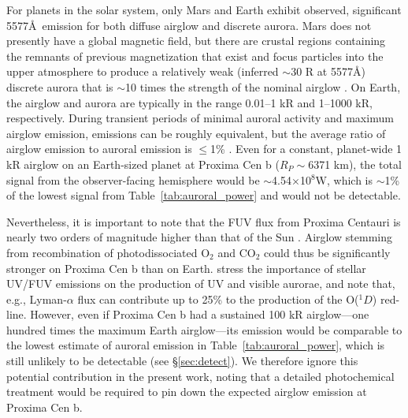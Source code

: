 \documentclass{emulateapj}
\begin{document}
For planets in the solar system, only Mars and Earth exhibit observed, significant 5577\AA\ emission for both diffuse airglow and discrete aurora. Mars does not presently have a global magnetic field, but there are crustal regions containing the remnants of previous magnetization that exist and focus particles into the upper atmosphere to produce a relatively weak (inferred $\sim$30 R at 5577\AA) discrete aurora that is $\sim$10 times the strength of the nominal airglow \citep[e.g.][]{Acuna2001,Bertaux2005,Lilensten2015}. On Earth, the airglow and aurora are typically in the range  0.01--1 kR and 1--1000 kR, respectively. During transient periods of minimal auroral activity and maximum airglow emission, emissions can be roughly equivalent, but the average ratio of airglow emission to auroral emission is $\leq$1\%  \citep[e.g.][]{Chamberlain1961,Greer1986}. Even for a constant, planet-wide 1 kR airglow on an Earth-sized planet at Proxima Cen b ($R_P\sim$6371 km), the total signal from the observer-facing hemisphere would be $\sim$4.54$\times$10$^8$W, which is $\sim$1\% of the lowest signal from Table~\ref{tab:auroral_power} and would not be detectable.

Nevertheless, it is important to note that the FUV flux from Proxima Centauri is nearly two orders of magnitude higher than that of the Sun \citep{Meadows2016}.  Airglow stemming from recombination of photodissociated O$_2$ and CO$_2$ could thus be significantly stronger on Proxima Cen b than on Earth. \citet{barthelemy2014} stress the importance of stellar UV/FUV emissions on the production of UV and visible aurorae, and note that, e.g., Lyman-$\alpha$ flux can contribute up to 25\% to the production of the O($^1D$) red-line. However, even if Proxima Cen b had a sustained 100 kR airglow---one hundred times the maximum Earth airglow---its emission would be comparable to the lowest estimate of auroral emission in Table~\ref{tab:auroral_power}, which is still unlikely to be detectable (see \S\ref{sec:detect}). We therefore ignore this potential contribution in the present work, noting that a detailed photochemical treatment would be required to pin down the expected airglow emission at Proxima Cen b.
\end{document}
